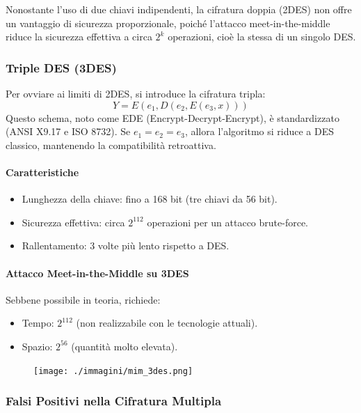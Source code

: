 \documentclass{report}
\begin{document}
Nonostante l’uso di due chiavi indipendenti, la cifratura doppia (2DES) non offre un vantaggio di sicurezza proporzionale, poiché l’attacco meet-in-the-middle riduce la sicurezza effettiva a circa $2^k$ operazioni, cioè la stessa di un singolo DES.

\subsubsection{Triple DES (3DES)}

Per ovviare ai limiti di 2DES, si introduce la cifratura tripla:
\[
Y = E(e_1, D(e_2, E(e_3, x)))
\]
Questo schema, noto come EDE (Encrypt-Decrypt-Encrypt), è standardizzato (ANSI X9.17 e ISO 8732). Se $e_1 = e_2 = e_3$, allora l’algoritmo si riduce a DES classico, mantenendo la compatibilità retroattiva.

\paragraph{Caratteristiche}

\begin{itemize}
    \item Lunghezza della chiave: fino a 168 bit (tre chiavi da 56 bit).
    \item Sicurezza effettiva: circa $2^{112}$ operazioni per un attacco brute-force.
    \item Rallentamento: 3 volte più lento rispetto a DES.
\end{itemize}

\paragraph{Attacco Meet-in-the-Middle su 3DES}

Sebbene possibile in teoria, richiede:
\begin{itemize}
    \item Tempo: $2^{112}$ (non realizzabile con le tecnologie attuali).
    \item Spazio: $2^{56}$ (quantità molto elevata).
\end{itemize}

\begin{figure}[h]
    \centering
    \texttt{[image: ./immagini/mim\_3des.png]}
    \end{figure}

\subsubsection{Falsi Positivi nella Cifratura Multipla}
\end{document}

